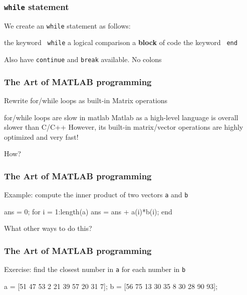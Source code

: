\documentclass[11pt]{beamer}
\begin{document}
\begin{frame}[fragile]
  \frametitle{\texttt{while} statement}
  \Enlarge

  \begin{itemize}
  \myitem  We create an \texttt{while} statement as follows:
    \begin{itemize}
    \mysubitem  the keyword \texttt{\color{red} while}
    \mysubitem  a logical comparison
    \mysubitem  a \textbf{block} of code 
    \mysubitem  the keyword \texttt{\color{red} end}
    \end{itemize}
  \myitem Also have \texttt{continue} and \texttt{break} available.
  \myitem No colons
  \end{itemize}
\end{frame}


\begin{frame}[fragile]
  \frametitle{The Art of MATLAB programming}
  \Enlarge

  \begin{itemize}
  \myitem  Rewrite for/while loops as built-in Matrix operations
  \begin{itemize}
  	\mysubitem  for/while loops are slow in matlab
	\mysubitem  Matlab as a high-level language is overall slower than C/C++
	\mysubitem  However, its built-in matrix/vector operations are highly optimized and very fast!
  \end{itemize}
  \myitem How?
  \end{itemize}
\end{frame}

\begin{frame}[fragile]
  \frametitle{The Art of MATLAB programming}
  \Enlarge
  \begin{itemize}
  	\myitem Example: compute the inner product of two vectors \texttt{a} and \texttt{b}
  \end{itemize}
  \begin{semiverbatim}
  ans = 0;
  for i = 1:length(a)
      ans = ans + a(i)*b(i);
  end
  \end{semiverbatim}
  \begin{itemize}
  	\myitem What other ways to do this?
  \end{itemize}
\end{frame}

\begin{frame}[fragile]
  \frametitle{The Art of MATLAB programming}
  \Enlarge
  \begin{itemize}
  	\myitem Exercise: find the closest number in \texttt{a} for each number in \texttt{b}
  \end{itemize}
  \begin{semiverbatim}
    a = [51  47  53   2  21  39  57  20  31   7];
    b = [56  75  13  30  35   8  30  28  90  93];
  \end{semiverbatim}
\end{frame}
\end{document}
